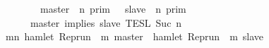 \begin{isabellebody}
\isanewline
\ \ \ \ \ \ \ {\isasymunion}\ {\isasymlbrakk}\ master\ {\isasymUp}\ n\ {\isasymrbrakk}\isactrlsub p\isactrlsub r\isactrlsub i\isactrlsub m\ {\isasyminter}\ {\isasymlbrakk}\ slave\ {\isasymUp}\ n\ {\isasymrbrakk}\isactrlsub p\isactrlsub r\isactrlsub i\isactrlsub m{\isacharparenright}\ \ %
\isanewline
\ \ \ \ \ {\isasyminter}\ {\isasymlbrakk}\ master\ implies\ slave\ {\isasymrbrakk}\isactrlsub T\isactrlsub E\isactrlsub S\isactrlsub L\isactrlbsup {\isasymge}\ Suc\ n\isactrlesup {\isacartoucheclose}\isanewline
%
\isadelimproof
%
\endisadelimproof
%
\isatagproof
{}\isamarkupfalse%
\ {\isacharminus}\isanewline
\ \ \isamarkupfalse%
\ {\isacartoucheopen}{\isacharbraceleft}{\isasymrho}{\isachardot}\ {\isasymforall}m{\isasymge}n{\isachardot}\ hamlet\ {\isacharparenleft}{\isacharparenleft}Rep{\isacharunderscore}run\ {\isasymrho}{\isacharparenright}\ m\ master{\isacharparenright}\ {\isasymlongrightarrow}\ hamlet\ {\isacharparenleft}{\isacharparenleft}Rep{\isacharunderscore}run\ {\isasymrho}{\isacharparenright}\ m\ slave{\isacharparenright}{\isacharbraceright}\isanewline

\end{isabellebody}
